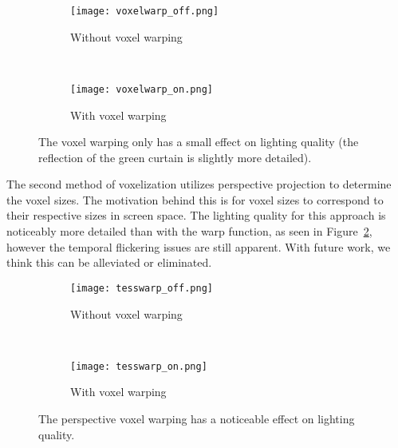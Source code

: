 \begin{figure}[h!]
    \centering
    \begin{subfigure}[t]{0.475\textwidth}
        \texttt{[image: voxelwarp\_off.png]}
        \caption{Without voxel warping}
    \end{subfigure}
    ~
    \begin{subfigure}[t]{0.475\textwidth}
        \texttt{[image: voxelwarp\_on.png]}
        \caption{With voxel warping}
    \end{subfigure}
    \caption{The voxel warping only has a small effect on lighting quality (the reflection of the green curtain is slightly more detailed).}
    \label{fig:results_voxelwarp}
\end{figure}

The second method of voxelization utilizes perspective projection to determine the voxel sizes. The motivation behind this is for voxel sizes to correspond to their respective sizes in screen space. The lighting quality for this approach is noticeably more detailed than with the warp function, as seen in Figure~\ref{fig:results_tesswarp}, however the temporal flickering issues are still apparent. With future work, we think this can be alleviated or eliminated.

\begin{figure}
    \centering
    \begin{subfigure}[t]{0.475\textwidth}
        \texttt{[image: tesswarp\_off.png]}
        \caption{Without voxel warping}
    \end{subfigure}
    ~
    \begin{subfigure}[t]{0.475\textwidth}
        \texttt{[image: tesswarp\_on.png]}
        \caption{With voxel warping}
    \end{subfigure}
    \caption{The perspective voxel warping has a noticeable effect on lighting quality.}
    \label{fig:results_tesswarp}
\end{figure}



